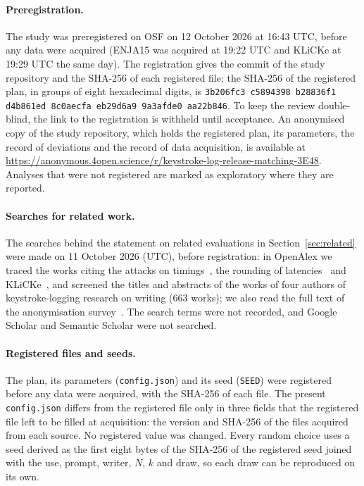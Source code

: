\begin{openscience}
\paragraph{Preregistration.}
The study was preregistered on OSF on 12 October 2026 at 16:43 UTC, before any data were acquired (ENJA15
was acquired at 19:22 UTC and KLiCKe at 19:29 UTC the same day). The registration gives the
commit of the study repository and the SHA-256 of each registered file; the SHA-256 of the registered plan, in groups of eight hexadecimal digits, is
\texttt{3b206fc3 c5894398 b28836f1 d4b861ed 8c0aecfa eb29d6a9 9a3afde0 aa22b846}. To keep the review double-blind, the link to
the registration is withheld until acceptance. An anonymised copy of the study repository, which holds the registered
plan, its parameters, the record of deviations and the record of data acquisition, is available at
{\def\UrlBreaks{\do\/}\def\UrlBigBreaks{}\url{https://anonymous.4open.science/r/keystroke-log-release-matching-3E48}}. Analyses that were not registered are marked as exploratory where they are
reported.

\paragraph{Searches for related work.}
The searches behind the statement on related evaluations in Section~\ref{sec:related} were made on 11 October 2026 (UTC), before registration: in OpenAlex we traced the
works citing the attacks on timings~\cite{gonzalez2021reverse,monaco2019searching,qiu2026keytar}, the rounding of
latencies~\cite{leinonen2017preventing} and KLiCKe~\cite{tian2025klicke}, and screened the titles and abstracts of the
works of four authors of keystroke-logging research on writing (663 works); we also read the full text of the
anonymisation survey~\cite{hanisch2021survey}. The search terms were not recorded, and Google Scholar and Semantic
Scholar were not searched.

\paragraph{Registered files and seeds.}
The plan, its parameters (\texttt{config.json}) and its seed (\texttt{SEED}) were registered before any data were
acquired, with the SHA-256 of each file. The present \texttt{config.json} differs from
the registered file only in three fields that the registered file left to be filled at acquisition: the version and
SHA-256 of the files acquired from each source. No registered value was changed. Every random choice uses a seed
derived as the first eight bytes of the SHA-256 of the registered seed joined with the use, prompt, writer, $N$, $k$ and
draw, so each draw can be reproduced on its own.


\end{openscience}
